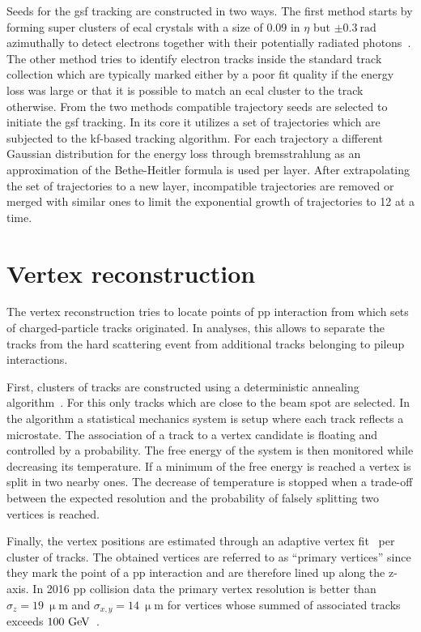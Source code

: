 Seeds for the \gls{gsf} tracking are constructed in two ways. The first method starts by forming super clusters of \gls{ecal} crystals with a size of 0.09 in $\eta$ but $\pm0.3~\mathrm{rad}$ azimuthally to detect electrons together with their potentially radiated photons~\cite{CMS:2010aua}. The other method tries to identify electron tracks inside the standard track collection which are typically marked either by a poor fit quality if the energy loss was large or that it is possible to match an \gls{ecal} cluster to the track otherwise. From the two methods compatible trajectory seeds are selected to initiate the \gls{gsf} tracking. In its core it utilizes a set of trajectories which are subjected to the \gls{kf}-based tracking algorithm. For each trajectory a different Gaussian distribution for the energy loss through bremsstrahlung as an approximation of the Bethe-Heitler formula is used per layer. After extrapolating the set of trajectories to a new layer, incompatible trajectories are removed or merged with similar ones to limit the exponential growth of trajectories to 12 at a time.




\section{Vertex reconstruction}


The vertex reconstruction tries to locate points of pp interaction from which sets of charged-particle tracks originated. In analyses, this allows to separate the tracks from the hard scattering event from additional tracks belonging to pileup interactions. 

First, clusters of tracks are constructed using a deterministic annealing algorithm~\cite{726788}. For this only tracks which are close to the beam spot are selected. In the algorithm a statistical mechanics system is setup where each track reflects a microstate. The association of a track to a vertex candidate is floating and controlled by a probability. The free energy of the system is then monitored while decreasing its temperature. If a minimum of the free energy is reached a vertex is split in two nearby ones. The decrease of temperature is stopped when a trade-off between the expected resolution and the probability of falsely splitting two vertices is reached.

Finally, the vertex positions are estimated through an adaptive vertex fit~\cite{0954-3899-34-12-N01} per cluster of tracks. The obtained vertices are referred to as ``primary vertices'' since they mark the point of a pp interaction and are therefore lined up along the z-axis. In 2016 pp collision data the primary vertex resolution is better than $\sigma_{z}=19~\upmu\mathrm{m}$ and $\sigma_{x,y}=14~\upmu\mathrm{m}$ for vertices whose summed \pt of associated tracks exceeds $100~\mathrm{GeV}$~\cite{CMS-DP-2016-041}.



